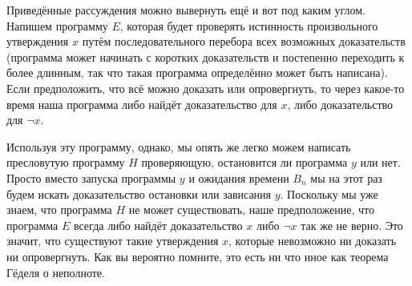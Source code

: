 Приведённые рассуждения можно вывернуть ещё и вот под каким углом. Напишем программу $E$, которая будет проверять истинность произвольного утверждения $x$ путём последовательного перебора всех возможных доказательств (программа может начинать с коротких доказательств и постепенно переходить к более длинным, так что такая программа определённо может быть написана). Если предположить, что всё можно доказать или опровергнуть, то через какое-то время наша программа либо найдёт доказательство для $x$, либо доказательство для $\neg x$.

Используя эту программу, однако, мы опять же легко можем написать пресловутую программу $H$ проверяющую, остановится ли программа $y$ или нет. Просто вместо запуска программы $y$ и ожидания времени $B_n$ мы на этот раз будем искать доказательство остановки или зависания $y$. Поскольку мы уже знаем, что программа $H$ не может существовать, наше предположение, что программа $E$ всегда либо найдёт доказательство $x$ либо $\neg x$ так же не верно. Это значит, что существуют такие утверждения $x$, которые невозможно ни доказать ни опровергнуть. Как вы вероятно помните, это есть ни что иное как теорема Гёделя о неполноте.

